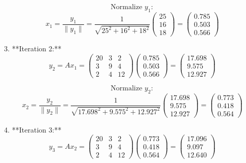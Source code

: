 \documentclass{article}
\begin{document}
\[ \text{Normalize } y_1: \]
\[ x_1 = \frac{y_1}{\| y_1 \|} = \frac{1}{\sqrt{25^2 + 16^2 + 18^2}} \begin{pmatrix} 25 \\ 16 \\ 18 \end{pmatrix} = \begin{pmatrix} 0.785 \\ 0.503 \\ 0.566 \end{pmatrix} \]

3. **Iteration 2:**
\[ y_2 = Ax_1 = \begin{pmatrix} 20 & 3 & 2 \\ 3 & 9 & 4 \\ 2 & 4 & 12 \end{pmatrix} \begin{pmatrix} 0.785 \\ 0.503 \\ 0.566 \end{pmatrix} = \begin{pmatrix} 17.698 \\ 9.575 \\ 12.927 \end{pmatrix} \]

\[ \text{Normalize } y_2: \]
\[ x_2 = \frac{y_2}{\| y_2 \|} = \frac{1}{\sqrt{17.698^2 + 9.575^2 + 12.927^2}} \begin{pmatrix} 17.698 \\ 9.575 \\ 12.927 \end{pmatrix} = \begin{pmatrix} 0.773 \\ 0.418 \\ 0.564 \end{pmatrix} \]

4. **Iteration 3:**
\[ y_3 = Ax_2 = \begin{pmatrix} 20 & 3 & 2 \\ 3 & 9 & 4 \\ 2 & 4 & 12 \end{pmatrix} \begin{pmatrix} 0.773 \\ 0.418 \\ 0.564 \end{pmatrix} = \begin{pmatrix} 17.096 \\ 9.097 \\ 12.640 \end{pmatrix} \]
\end{document}
